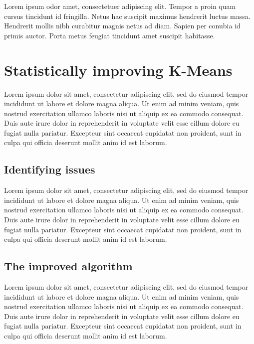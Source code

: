 \documentclass[10pt,twocolumn,letterpaper]{article}
\begin{document}
Lorem ipsum odor amet, consectetuer adipiscing elit. Tempor a proin quam cursus
tincidunt id fringilla. Netus hac suscipit maximus hendrerit luctus massa.
Hendrerit mollis nibh curabitur magnis netus ad diam. Sapien per conubia id
primis auctor. Porta metus feugiat tincidunt amet suscipit habitasse.


\section{Statistically improving K-Means}\label{sec:statistically-improving-k-means}

Lorem ipsum dolor sit amet, consectetur adipiscing elit, sed do eiusmod tempor
incididunt ut labore et dolore magna aliqua. Ut enim ad minim veniam, quis
nostrud exercitation ullamco laboris nisi ut aliquip ex ea commodo consequat.
Duis aute irure dolor in reprehenderit in voluptate velit esse cillum dolore eu
fugiat nulla pariatur. Excepteur sint occaecat cupidatat non proident, sunt in
culpa qui officia deserunt mollit anim id est laborum.


\subsection{Identifying issues}\label{subsec:identifying-issues}

Lorem ipsum dolor sit amet, consectetur adipiscing elit, sed do eiusmod tempor
incididunt ut labore et dolore magna aliqua. Ut enim ad minim veniam, quis
nostrud exercitation ullamco laboris nisi ut aliquip ex ea commodo consequat.
Duis aute irure dolor in reprehenderit in voluptate velit esse cillum dolore eu
fugiat nulla pariatur. Excepteur sint occaecat cupidatat non proident, sunt in
culpa qui officia deserunt mollit anim id est laborum.


\subsection{The improved algorithm}\label{subsec:the-improved-algorithm}

Lorem ipsum dolor sit amet, consectetur adipiscing elit, sed do eiusmod tempor
incididunt ut labore et dolore magna aliqua. Ut enim ad minim veniam, quis
nostrud exercitation ullamco laboris nisi ut aliquip ex ea commodo consequat.
Duis aute irure dolor in reprehenderit in voluptate velit esse cillum dolore eu
fugiat nulla pariatur. Excepteur sint occaecat cupidatat non proident, sunt in
culpa qui officia deserunt mollit anim id est laborum.
\end{document}
